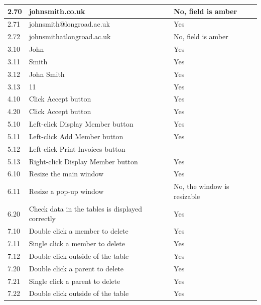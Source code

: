 \begin{center}
\begin{longtable}{|p{2cm}|p{5cm}|p{8cm}|}
        2.70 & johnsmith.co.uk & No, field is amber \\ \hline
        2.71 & johnsmith@longroad.ac.uk & Yes \\ \hline
        2.72 & johnsmithatlongroad.ac.uk & No, field is amber \\ \hline
        
        3.10 & John & Yes \\ \hline
        3.11 & Smith & Yes \\ \hline
        3.12 & John Smith &  Yes \\ \hline
        3.13 & 11 & Yes \\ \hline
        
        4.10 & Click Accept button & Yes \\ \hline
        
        4.20 & Click Accept button & Yes \\ \hline
        
        5.10 & Left-click Display Member button & Yes \\ \hline
        5.11 & Left-click Add Member button & Yes \\ \hline
        \rowcolor{darkgrey} 5.12 & Left-click Print Invoices button & \\ \hline
        5.13 & Right-click Display Member button & Yes \\ \hline
        
        6.10 & Resize the main window & Yes \\ \hline
        6.11 & Resize a pop-up window & No, the window is resizable\\ \hline
        
        6.20 & Check data in the tables is displayed correctly & Yes \\ \hline

       \rowcolor{lightgrey} 7.10 & Double click a member to delete & Yes \\ \hline
       \rowcolor{lightgrey} 7.11 & Single click a member to delete & Yes \\ \hline
       \rowcolor{lightgrey} 7.12 & Double click outside of the table & Yes \\ \hline

       \rowcolor{lightgrey} 7.20 & Double click a parent to delete & Yes \\ \hline
       \rowcolor{lightgrey} 7.21 & Single click a parent to delete & Yes\\ \hline
       \rowcolor{lightgrey} 7.22 & Double click outside of the table & Yes \\ \hline
        

\end{longtable}
\end{center}
